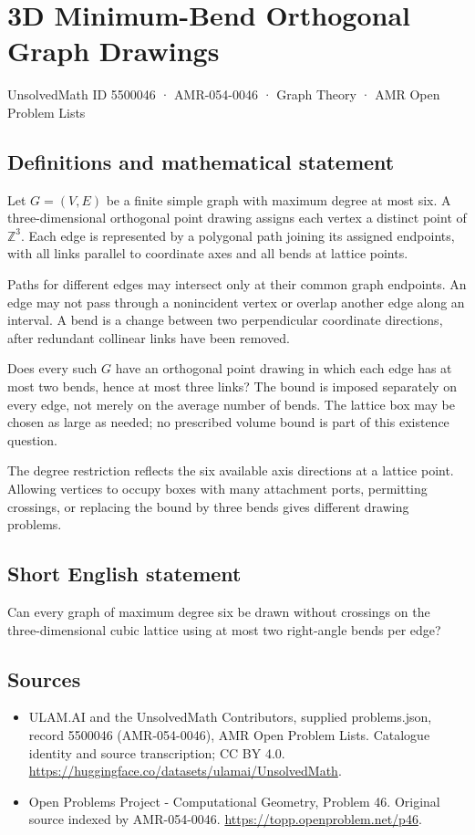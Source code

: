 \documentclass[11pt,a4paper]{article}
\begin{document}
\section*{3D Minimum-Bend Orthogonal Graph Drawings}\label{5500046}
{\small UnsolvedMath ID 5500046 · AMR-054-0046 · Graph Theory · AMR Open Problem Lists}
\subsection{Definitions and mathematical statement}
Let $G=(V,E)$ be a finite simple graph with maximum degree at most
six. A three-dimensional orthogonal point drawing assigns each
vertex a distinct point of $\mathbb Z^3$. Each edge is represented
by a polygonal path joining its assigned endpoints, with all links
parallel to coordinate axes and all bends at lattice points.

Paths for different edges may intersect only at their common graph
endpoints. An edge may not pass through a nonincident vertex or
overlap another edge along an interval. A bend is a change between
two perpendicular coordinate directions, after redundant collinear
links have been removed.

Does every such $G$ have an orthogonal point drawing in which each
edge has at most two bends, hence at most three links? The bound
is imposed separately on every edge, not merely on the average
number of bends. The lattice box may be chosen as large as needed;
no prescribed volume bound is part of this existence question.

The degree restriction reflects the six available axis directions
at a lattice point. Allowing vertices to occupy boxes with many
attachment ports, permitting crossings, or replacing the bound by
three bends gives different drawing problems.
\subsection{Short English statement}
Can every graph of maximum degree six be drawn without crossings
on the three-dimensional cubic lattice using at most two right-angle
bends per edge?
\subsection{Sources}
\begin{itemize}
\item[S1] ULAM.AI and the UnsolvedMath Contributors, supplied problems.json, record 5500046 (AMR-054-0046), AMR Open Problem Lists. Catalogue identity and source transcription; CC BY 4.0.
\url{https://huggingface.co/datasets/ulamai/UnsolvedMath}.
\item[S2] Open Problems Project - Computational Geometry, Problem 46. Original source indexed by AMR-054-0046.
\url{https://topp.openproblem.net/p46}.
\end{itemize}
\end{document}
